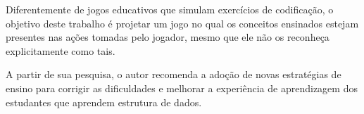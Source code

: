 Diferentemente de jogos educativos que simulam exercícios de codificação, o objetivo deste trabalho é projetar um jogo no qual os conceitos ensinados estejam presentes nas ações tomadas pelo jogador, mesmo que ele não os reconheça explicitamente como tais.

A partir de sua pesquisa, o autor \cite{mtaho2024difficulties} recomenda a adoção de novas estratégias de ensino para corrigir as dificuldades e melhorar a experiência de aprendizagem dos estudantes que aprendem estrutura de dados.
